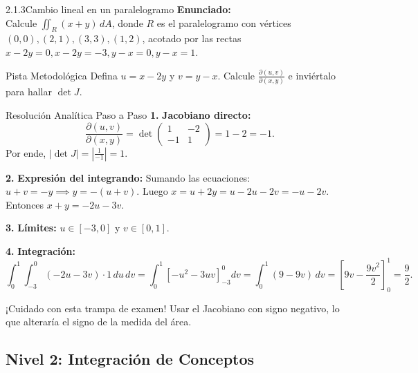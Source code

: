 \documentclass[11pt,a4paper]{article}
\begin{document}
\begin{nivelbox}{2.1.3}{Cambio lineal en un paralelogramo}
\textbf{Enunciado:}\\
Calcule $\iint_R (x + y) \, dA$, donde $R$ es el paralelogramo con vértices $(0,0), (2,1), (3,3), (1,2)$, acotado por las rectas $x - 2y = 0, x - 2y = -3, y - x = 0, y - x = 1$.

\begin{observacionbox}{Pista Metodológica}
Defina $u = x - 2y$ y $v = y - x$. Calcule $\frac{\partial(u,v)}{\partial(x,y)}$ e inviértalo para hallar $\det J$.
\end{observacionbox}

\begin{ejerciciobox}{Resolución Analítica Paso a Paso}
\smallskip\noindent\textbf{1.} \textbf{Jacobiano directo:}
\[\frac{\partial(u,v)}{\partial(x,y)} = \det \begin{pmatrix} 1 & -2 \\ -1 & 1 \end{pmatrix} = 1 - 2 = -1.\]
Por ende, $|\det J| = \left| \frac{1}{-1} \right| = 1$.

\smallskip\noindent\textbf{2.} \textbf{Expresión del integrando:}
Sumando las ecuaciones: $u + v = -y \implies y = -(u+v)$. Luego $x = u + 2y = u - 2u - 2v = -u - 2v$.
Entonces $x + y = -2u - 3v$.

\smallskip\noindent\textbf{3.} \textbf{Límites:} $u \in [-3, 0]$ y $v \in [0, 1]$.

\smallskip\noindent\textbf{4.} \textbf{Integración:}
\[\int_0^1 \int_{-3}^0 (-2u - 3v) \cdot 1 \, du \, dv = \int_0^1 \left[ -u^2 - 3uv \right]_{-3}^0 dv = \int_0^1 (9 - 9v) \, dv = \left[ 9v - \frac{9v^2}{2} \right]_0^1 = \frac{9}{2}.\]
\end{ejerciciobox}

\begin{errorbox}{¡Cuidado con esta trampa de examen!}
Usar el Jacobiano con signo negativo, lo que alteraría el signo de la medida del área.
\end{errorbox}
\end{nivelbox}
\bigskip

\subsection{Nivel 2: Integración de Conceptos}
\end{document}
